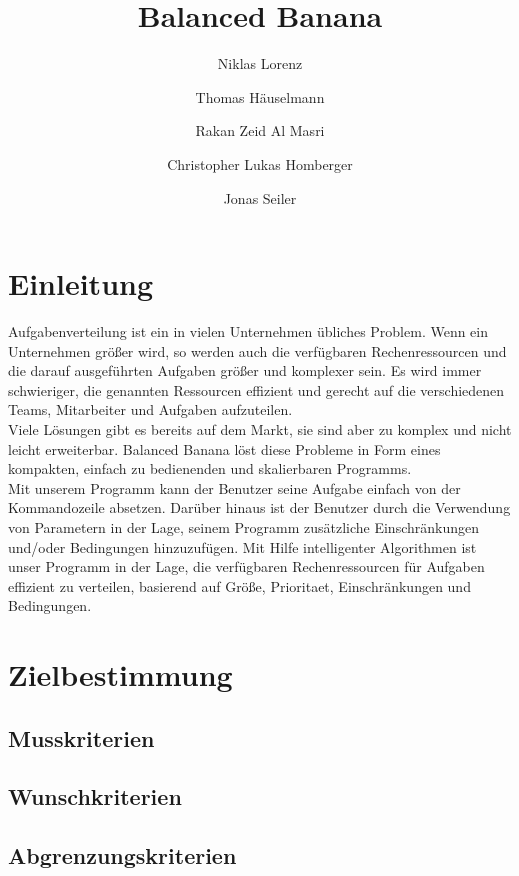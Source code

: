 \documentclass[a4paper,12pt]{article}
\title{Balanced Banana}
\author{Niklas Lorenz \and Thomas Häuselmann \and Rakan Zeid Al Masri \and Christopher Lukas Homberger \and Jonas Seiler}
\begin{document}
\setcounter{page}{2}
\tableofcontents          %
\clearpage
{}

\section{Einleitung}
\vspace*{1cm}

Aufgabenverteilung ist ein in vielen Unternehmen übliches Problem. Wenn ein Unternehmen größer wird, 
so werden auch die verfügbaren Rechenressourcen und die darauf ausgeführten Aufgaben größer und komplexer sein. Es wird immer schwieriger, die genannten Ressourcen effizient und gerecht auf die verschiedenen Teams, Mitarbeiter und Aufgaben aufzuteilen. \\

Viele Lösungen gibt es bereits auf dem Markt, sie sind aber zu komplex und nicht leicht erweiterbar. Balanced Banana löst diese Probleme in Form eines kompakten, einfach zu bedienenden und skalierbaren Programms. \\

Mit unserem Programm kann der Benutzer seine Aufgabe einfach von der Kommandozeile absetzen. Darüber hinaus ist der Benutzer durch die Verwendung von Parametern in der Lage, seinem Programm zusätzliche Einschränkungen und/oder Bedingungen hinzuzufügen. Mit Hilfe intelligenter Algorithmen ist unser Programm in der Lage, die verfügbaren Rechenressourcen für Aufgaben effizient zu verteilen, basierend auf Größe, \gls{Prioritaet}, Einschränkungen und Bedingungen.

\section{Zielbestimmung}
\subsection{Musskriterien}
\subsection{Wunschkriterien}
\subsection{Abgrenzungskriterien}
\end{document}
